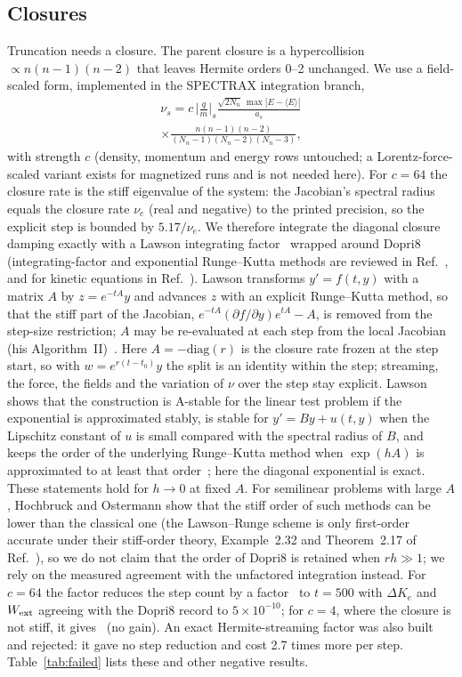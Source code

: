 \documentclass[aps,pre,reprint,floatfix,amsmath,amssymb,nofootinbib,superscriptaddress]{revtex4-2}
\newcommand{\Wext}{W_{\rm ext}}
\begin{document}
\subsection{Closures}
Truncation needs a closure. The parent closure is a hypercollision $\propto n(n-1)(n-2)$ that leaves Hermite orders 0--2 unchanged. We use a field-scaled form, implemented in the SPECTRAX integration branch,
\begin{multline}
\nu_s=c\,\Big|\frac{q}{m}\Big|_s\frac{\sqrt{2N_n}\,\max|E-\langle E\rangle|}{a_s}\\\times\frac{n(n-1)(n-2)}{(N_n-1)(N_n-2)(N_n-3)},
\end{multline}
with strength $c$ (density, momentum and energy rows untouched; a Lorentz-force-scaled variant exists for magnetized runs and is not needed here). For $c=64$ the closure rate is the stiff eigenvalue of the system: the Jacobian's spectral radius equals the closure rate $\nu_e$ (real and negative) to the printed precision, so the explicit step is bounded by $5.17/\nu_e$. We therefore integrate the diagonal closure damping exactly with a Lawson integrating factor~\cite{Lawson1967} wrapped around Dopri8 (integrating-factor and exponential Runge--Kutta methods are reviewed in Ref.~\cite{Hochbruck2010}, and for kinetic equations in Ref.~\cite{Crouseilles2020}). Lawson transforms $y'=f(t,y)$ with a matrix $A$ by $z=e^{-tA}y$ and advances $z$ with an explicit Runge--Kutta method, so that the stiff part of the Jacobian, $e^{-tA}(\partial f/\partial y)e^{tA}-A$, is removed from the step-size restriction; $A$ may be re-evaluated at each step from the local Jacobian (his Algorithm~II)~\cite{Lawson1967}. Here $A=-\mathrm{diag}(r)$ is the closure rate frozen at the step start, so with $w=e^{r(t-t_0)}y$ the split is an identity within the step; streaming, the force, the fields and the variation of $\nu$ over the step stay explicit. Lawson shows that the construction is A-stable for the linear test problem if the exponential is approximated stably, is stable for $y'=By+u(t,y)$ when the Lipschitz constant of $u$ is small compared with the spectral radius of $B$, and keeps the order of the underlying Runge--Kutta method when $\exp(hA)$ is approximated to at least that order~\cite{Lawson1967}; here the diagonal exponential is exact. These statements hold for $h\to0$ at fixed $A$. For semilinear problems with large $A$, Hochbruck and Ostermann show that the stiff order of such methods can be lower than the classical one (the Lawson--Runge scheme is only first-order accurate under their stiff-order theory, Example~2.32 and Theorem~2.17 of Ref.~\cite{Hochbruck2010}), so we do not claim that the order of Dopri8 is retained when $rh\gg1$; we rely on the measured agreement with the unfactored integration instead. For $c=64$ the factor reduces the step count by a factor \lawsonSteps\ to $t=500$ with $\Delta K_e$ and $\Wext$ agreeing with the Dopri8 record to $5\times10^{-10}$; for $c=4$, where the closure is not stiff, it gives \lawsonStepsFour\ (no gain). An exact Hermite-streaming factor was also built and rejected: it gave no step reduction and cost 2.7 times more per step. Table~\ref{tab:failed} lists these and other negative results.
\end{document}
